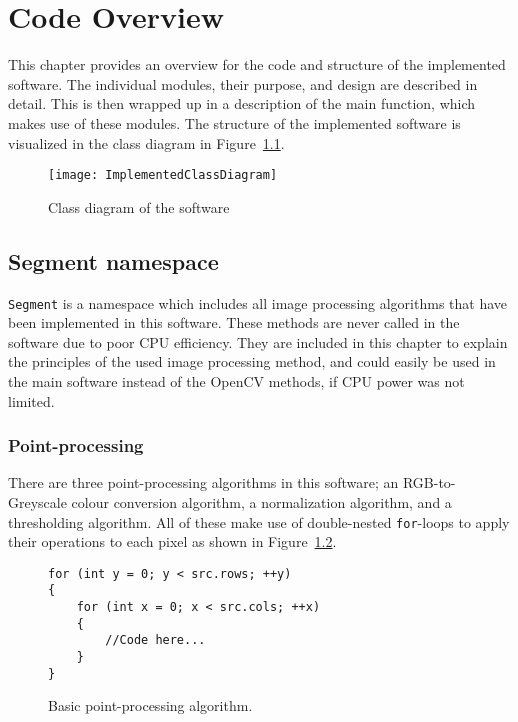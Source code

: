 \chapter{Code Overview}\label{ch:codeover}
This chapter provides an overview for the code and structure of the implemented software. The individual modules, their purpose, and design are described in detail. This is then wrapped up in a description of the main function, which makes use of these modules.
The structure of the implemented software is visualized in the class diagram in Figure~\ref{fig:implementedClassDiagram}.

\begin{figure}
	\centering
	\texttt{[image: ImplementedClassDiagram]}
	\caption{Class diagram of the software \label{fig:implementedClassDiagram}}
	
\end{figure}


\section{Segment namespace}
\texttt{Segment} is a namespace which includes all image processing algorithms that have been implemented in this software. These methods are never called in the software due to poor CPU efficiency. They are included in this chapter to explain the principles of the used image processing method, and could easily be used in the main software instead of the OpenCV methods, if CPU power was not limited.

\subsection{Point-processing}
There are three point-processing algorithms in this software; an RGB-to-Greyscale colour conversion algorithm, a normalization algorithm, and a thresholding algorithm. All of these make use of double-nested \texttt{for}-loops to apply their operations to each pixel as shown in Figure~\ref{fig:pointprocess}.
\begin{figure}[!h]
\begin{lstlisting}
for (int y = 0; y < src.rows; ++y)
{
	for (int x = 0; x < src.cols; ++x)
	{
		//Code here...
	}
}
\end{lstlisting}
\caption{Basic point-processing algorithm. \label{fig:pointprocess}}
\end{figure} 

